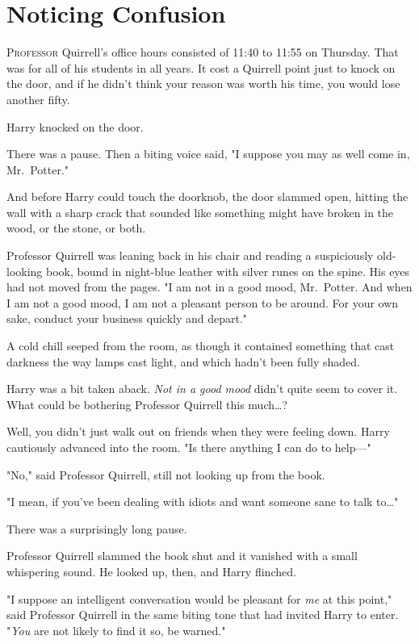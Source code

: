 \chapter{Noticing Confusion}

\lettrine{P}{rofessor} Quirrell's office hours consisted of 11:40 to 11:55 \AM on Thursday. 
That was for all of his students in all years. It cost a Quirrell point just to 
knock on the door, and if he didn't think your reason was worth his time, you 
would lose another fifty.

Harry knocked on the door.

There was a pause. Then a biting voice said, "I suppose you may as well come 
in, Mr.~Potter."

And before Harry could touch the doorknob, the door slammed open, hitting the 
wall with a sharp crack that sounded like something might have broken in the 
wood, or the stone, or both.

Professor Quirrell was leaning back in his chair and reading a suspiciously 
old-looking book, bound in night-blue leather with silver runes on the spine. 
His eyes had not moved from the pages. "I am not in a good mood, Mr.~Potter. 
And when I am not a good mood, I am not a pleasant person to be around. For 
your own sake, conduct your business quickly and depart."

A cold chill seeped from the room, as though it contained something that cast 
darkness the way lamps cast light, and which hadn't been fully shaded.

Harry was a bit taken aback. \emph{Not in a good mood} didn't quite seem to 
cover it. What could be bothering Professor Quirrell this much{\ldots}?

Well, you didn't just walk out on friends when they were feeling down. Harry 
cautiously advanced into the room. "Is there anything I can do to help---"

"No," said Professor Quirrell, still not looking up from the book.

"I mean, if you've been dealing with idiots and want someone sane to talk 
to{\ldots}"

There was a surprisingly long pause.

Professor Quirrell slammed the book shut and it vanished with a small 
whispering sound. He looked up, then, and Harry flinched.

"I suppose an intelligent conversation would be pleasant for \emph{me} at this 
point," said Professor Quirrell in the same biting tone that had invited Harry 
to enter. "\emph{You} are not likely to find it so, be warned."

